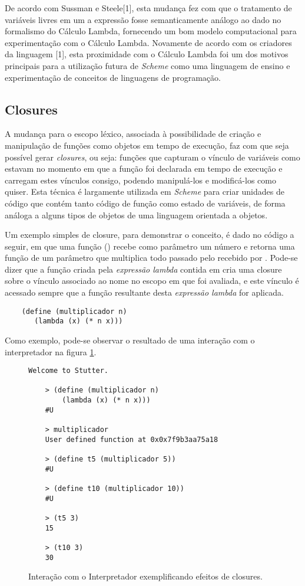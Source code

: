 De acordo com Sussman e Steele[1], esta mudança fez com que o tratamento de
variáveis livres em um a expressão fosse semanticamente análogo ao dado no
formalismo do Cálculo Lambda, fornecendo um bom modelo computacional para
experimentação com o Cálculo Lambda. Novamente de acordo com os criadores da
linguagem [1], esta proximidade com o Cálculo Lambda foi um dos motivos
principais para a utilização futura de \textit{Scheme} como uma linguagem de
ensino e experimentação de conceitos de linguagens de programação.

\subsection{Closures}

A mudança para o escopo léxico, associada à possibilidade de criação e
manipulação de funções como objetos em tempo de execução, faz com que seja
possível gerar \textit{closures}, ou seja: funções que capturam o vínculo de
variáveis como estavam no momento em que a função foi declarada em tempo de
execução e carregam estes vínculos consigo, podendo manipulá-los e modificá-los
como quiser. Esta técnica é largamente utilizada em \textit{Scheme} para criar
unidades de código que contém tanto código de função como estado de variáveis,
de forma análoga a alguns tipos de objetos de uma linguagem orientada a
objetos.

Um exemplo simples de closure, para demonstrar o conceito, é dado no código a
seguir, em que uma função () recebe como parâmetro um
número  e retorna uma função de um parâmetro  que multiplica
todo  passado pelo  recebido por . Pode-se
dizer que a função criada pela \textit{expressão lambda} contida em
 cria uma closure sobre o vínculo associado ao nome 
no escopo em que foi avaliada, e este vínculo é acessado sempre que a função
resultante desta \textit{expressão lambda} for aplicada.

\begin{lstlisting}
    (define (multiplicador n)
       (lambda (x) (* n x)))
\end{lstlisting}

Como exemplo, pode-se observar o resultado de uma interação com o interpretador
na figura \ref{fig:interacao-closure}.

\begin{figure}[h!]
\begin{lstlisting}[numbers=none]
    Welcome to Stutter.
    
    > (define (multiplicador n) 
        (lambda (x) (* n x)))
    #U
    
    > multiplicador
    User defined function at 0x0x7f9b3aa75a18
    
    > (define t5 (multiplicador 5))
    #U
    
    > (define t10 (multiplicador 10))
    #U
    
    > (t5 3)
    15
    
    > (t10 3)
    30
\end{lstlisting}
\caption{Interação com o Interpretador exemplificando efeitos de closures.}
\label{fig:interacao-closure}
\end{figure}

